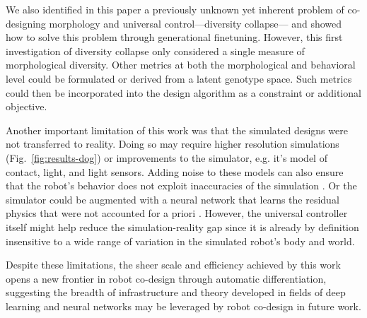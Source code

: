 We also identified in this paper a previously unknown yet inherent problem of co-designing morphology and universal control---diversity collapse---%
and showed how to solve this problem through
generational finetuning.
However, this first investigation of diversity collapse 
only considered a single measure of morphological diversity.
Other metrics at both the morphological and behavioral level could be formulated or derived from a latent genotype space.
Such metrics could then be incorporated into the design algorithm as a constraint or additional objective. 


Another important limitation of this work was that the simulated designs were not transferred to reality.
Doing so may require
higher resolution simulations (Fig.~\ref{fig:results-dog})
or
improvements to the simulator, e.g. it's model of contact, light, and light sensors.
Adding noise to these models can also ensure that the robot's behavior does not exploit inaccuracies of the simulation \cite{jakobi1995noise}.
Or the simulator could be augmented with a neural network that learns the residual physics that were not accounted for a priori \cite{gao2024sim}.
However, the universal controller itself might help reduce the simulation-reality gap since it is already by definition insensitive to a wide range of variation in the simulated robot's body and world.


Despite these limitations, the sheer scale and efficiency achieved by this work
opens a new frontier in robot co-design through automatic differentiation, 
suggesting the breadth of infrastructure and theory developed in fields of deep learning and neural networks may be leveraged by robot co-design in future work.

